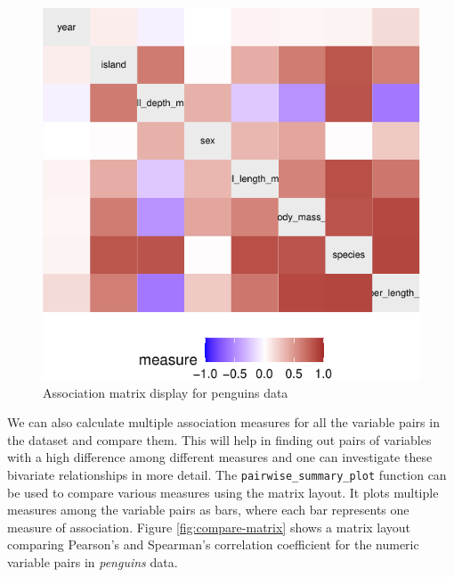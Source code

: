 \begin{Schunk}
\begin{figure}

{\centering \includegraphics{rj_paper_files/figure-latex/assoc-heatmap-1} 

}

\caption[Association matrix display for penguins data]{Association matrix display for penguins data}\label{fig:assoc-heatmap}
\end{figure}
\end{Schunk}

We can also calculate multiple association measures for all the variable
pairs in the dataset and compare them. This will help in finding out
pairs of variables with a high difference among different measures and
one can investigate these bivariate relationships in more detail. The
\texttt{pairwise\_summary\_plot} function can be used to compare various
measures using the matrix layout. It plots multiple measures among the
variable pairs as bars, where each bar represents one measure of
association. Figure \ref{fig:compare-matrix} shows a matrix layout
comparing Pearson's and Spearman's correlation coefficient for the
numeric variable pairs in \emph{penguins} data.

